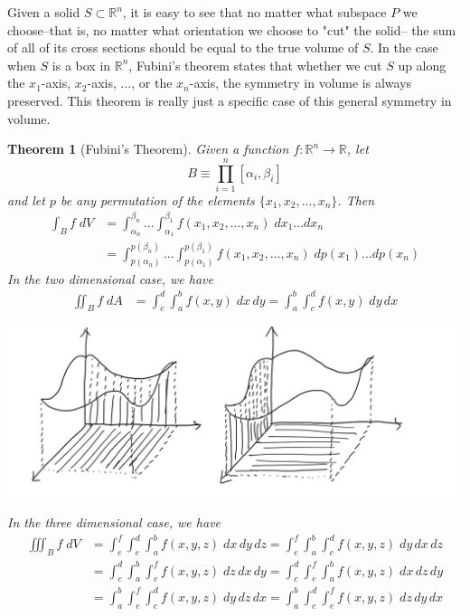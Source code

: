 \documentclass{article}
\newtheorem{theorem}{Theorem}[section]
\theoremstyle{remark}
\theoremstyle{definition}
\begin{document}
Given a solid $S \subset \mathbb{R}^n$, it is easy to see that no matter what subspace $P$ we choose–that is, no matter what orientation we choose to "cut" the solid– the sum of all of its cross sections should be equal to the true volume of $S$. In the case when $S$ is a box in $\mathbb{R}^n$, Fubini's theorem states that whether we cut $S$ up along the $x_1$-axis, $x_2$-axis, ..., or the $x_n$-axis, the symmetry in volume is always preserved. This theorem is really just a specific case of this general symmetry in volume. 

\begin{theorem}[Fubini's Theorem]
Given a function $f: \mathbb{R}^n \longrightarrow \mathbb{R}$, let 
\[B \equiv \prod_{i=1}^n [\alpha_i, \beta_i]\]
and let 
$p$ be any permutation of the elements $\{x_1, x_2, ..., x_n\}$. Then 
\begin{align*}
    \int_B f \; d V & = \int_{\alpha_n}^{\beta_n} ... \int_{\alpha_1}^{\beta_1} f(x_1,x_2,...,x_n) \; d x_1 ... d x_n \\
    & = \int_{p(\alpha_n)}^{p(\beta_n)} ... \int_{p(\alpha_1)}^{p(\beta_1)} f(x_1,x_2, ..., x_n) \; d p(x_1) ... d p(x_n) 
\end{align*}
In the two dimensional case, we have
\begin{align*}
    \iint_B f \; d A & = \int_c^d \int_a^b f(x, y) \; d x \, d y = \int_a^b \int_c^d f(x, y) \; d y \, d x 
\end{align*}
\begin{center}
    \includegraphics[scale=0.27]{img/Fubini_Theorem.PNG}
\end{center}
In the three dimensional case, we have
\begin{align*}
    \iiint_B f \; d V & 
    = \int_e^f \int_c^d \int_a^b f(x, y, z) \; d x \, d y \, d z = \int_e^f \int_a^b \int_c^d f(x, y, z) \; d y \, d x \, d z \\
    & = \int_c^d \int_a^b \int_e^f f(x, y, z) \; d z \, d x \, d y = \int_c^d \int_e^f \int_a^b f(x, y, z) \; d x \, d z \, d y \\
    & = \int_a^b \int_e^f \int_c^d f(x, y, z) \; d y \, d z \, d x = \int_a^b \int_c^d \int_e^f f(x, y, z) \; d z \, d y \, d x 
\end{align*}
\end{theorem}
\end{document}
